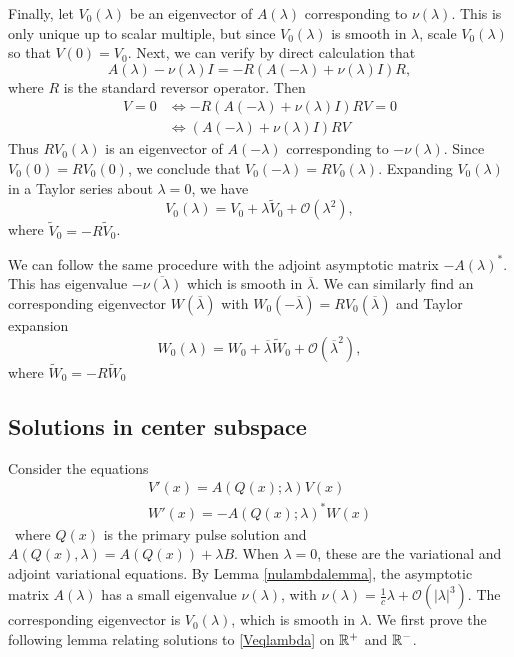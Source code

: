 \documentclass[thesis.tex]{subfiles}
\begin{document}
Finally, let $V_0(\lambda)$ be an eigenvector of $A(\lambda)$ corresponding to $\nu(\lambda)$. This is only unique up to scalar multiple, but since $V_0(\lambda)$ is smooth in $\lambda$, scale $V_0(\lambda)$ so that $V(0) = V_0$. Next, we can verify by direct calculation that 
\[
A(\lambda) - \nu(\lambda) I = -R(A(-\lambda) + \nu(\lambda) I)R,
\]
where $R$ is the standard reversor operator. Then
\begin{align*}
[A(\lambda) - \nu(\lambda) I]V = 0 &\iff
-R(A(-\lambda) + \nu(\lambda) I)RV = 0 \\
&\iff (A(-\lambda) + \nu(\lambda) I)RV
\end{align*}
Thus $RV_0(\lambda)$ is an eigenvector of $A(-\lambda)$ corresponding to $-\nu(\lambda)$. Since $V_0(0) = RV_0(0)$, we conclude that $V_0(-\lambda) = R V_0(\lambda)$. Expanding $V_0(\lambda)$ in a Taylor series about $\lambda = 0$, we have
\[
V_0(\lambda) = V_0 + \lambda \tilde{V}_0 + \mathcal{O}(\lambda^2),
\]
where $\tilde{V}_0 = -R \tilde{V}_0$.

We can follow the same procedure with the adjoint asymptotic matrix $-A(\lambda)^*$. This has eigenvalue $-\overline{\nu(\lambda)}$ which is smooth in $\overline{\lambda}$. We can similarly find an corresponding eigenvector $W(\overline{\lambda})$ with $W_0(-\overline{\lambda}) = R V_0(\overline{\lambda})$ and Taylor expansion
\[
W_0(\lambda) = W_0 + \overline{\lambda} \tilde{W}_0 + \mathcal{O}(\overline{\lambda}^2),
\]
where $\tilde{W}_0 = -R \tilde{W}_0$

\subsection{Solutions in center subspace}

Consider the equations
\begin{align}
V'(x) = A(Q(x); \lambda) V(x) \label{Veqlambda} \\
W'(x) = -A(Q(x); \lambda)^* W(x) \label{Weqlambda}
\end{align}\
where $Q(x)$ is the primary pulse solution and $A(Q(x), \lambda) = A(Q(x)) + \lambda B$. When $\lambda = 0$, these are the variational and adjoint variational equations. By Lemma \ref{nulambdalemma}, the asymptotic matrix $A(\lambda)$ has a small eigenvalue $\nu(\lambda)$, with $\nu(\lambda) = \frac{1}{c} \lambda + \mathcal{O}(|\lambda|^3)$. The corresponding eigenvector is $V_0(\lambda)$, which is smooth in $\lambda$. We first prove the following lemma relating solutions to \eqref{Veqlambda} on $\mathbb{R}^+$ and $\mathbb{R}^-$.
\end{document}
